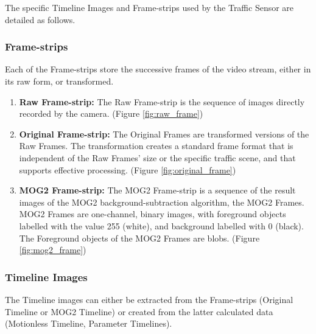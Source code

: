 The specific Timeline Images and Frame-strips used by the Traffic Sensor are detailed as follows.

\subsubsection{Frame-strips}
Each of the Frame-strips store the successive frames of the video stream, either in its raw form, or transformed.
\begin{enumerate}
	\item \textbf{Raw Frame-strip:} The Raw Frame-strip is the sequence of images directly recorded by the camera. (Figure \ref{fig:raw_frame})
	
	\item \textbf{Original Frame-strip:} The Original Frames are transformed versions of the Raw Frames. The transformation creates a standard frame format that is independent of the Raw Frames' size or the specific traffic scene, and that supports effective processing. (Figure \ref{fig:original_frame})
	
	\item \textbf{MOG2 Frame-strip:} The MOG2 Frame-strip is a sequence of the result images of the MOG2 background-subtraction algorithm, the MOG2 Frames. MOG2 Frames are one-channel, binary images, with foreground objects labelled with the value 255 (white), and background labelled with 0 (black). The Foreground objects of the MOG2 Frames are blobs. (Figure \ref{fig:mog2_frame})
\end{enumerate}

\subsubsection{Timeline Images}
The Timeline images can either be extracted from the Frame-strips (Original Timeline or MOG2 Timeline) or created from the latter calculated data (Motionless Timeline, Parameter Timelines).

